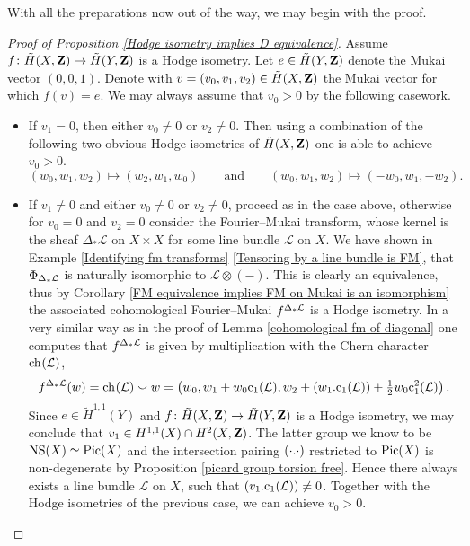 \noindent
With all the preparations now out of the way, we may begin with the proof.
\begin{proof}[Proof of Proposition \ref{Hodge isometry implies D equivalence}]
    Assume $f \colon \,\tilde{\!{H}}(X, \mathbf Z) \to \,\tilde{\!{H}}(Y, \mathbf Z)$ is a Hodge isometry. Let $e \in \,\tilde{\!{H}}(Y, \mathbf Z)$ denote the Mukai vector $(0,0,1)$. Denote with $v =(v_0, v_1, v_2) \in \,\tilde{\!{H}}(X, \mathbf Z)$ the Mukai vector for which $f(v) = e$. We may always assume that $v_0 > 0$ by the following casework.
    \begin{itemize}[label = $\circ$]
        \item If $v_1 = 0$, then either $v_0 \neq 0$ or $v_2 \neq 0$. Then using a combination of the following two obvious Hodge isometries of $\,\tilde{\!{H}}(X, \mathbf Z)$ one is able to achieve $v_0 > 0$. 
        \[
            (w_0, w_1, w_2) \mapsto (w_2, w_1, w_0) \qquad \text{and} \qquad (w_0, w_1, w_2) \mapsto (-w_0, w_1, -w_2).
        \]
        \item If $v_1 \neq 0$ and either $v_0 \neq 0$ or $v_2 \neq 0$, proceed as in the case above, otherwise for $v_0 = 0$ and $v_2 = 0$ consider the Fourier--Mukai transform, whose kernel is the sheaf $\Delta_*\mathcal L$ on $X \times X$ for some line bundle $\mathcal L$ on $X$. We have shown in Example \ref{Identifying fm transforms} \ref{Tensoring by a line bundle is FM}, that $\Phi_{\Delta_*\mathcal L}$ is naturally isomorphic to $\mathcal L \otimes (-)$. This is clearly an equivalence, thus by Corollary \ref{FM equivalence implies FM on Mukai is an isomorphism} the associated cohomological Fourier--Mukai $f^{\Delta_*\mathcal L}$ is a Hodge isometry. In a very similar way as in the proof of Lemma \ref{cohomological fm of diagonal} one computes that $f^{\Delta_*\mathcal L}$ is given by multiplication with the Chern character $\ch[](\mathcal L)$, \ie
        \[
            \fmcoh{\Delta_*\mathcal{L}}(w) = \ch[](\mathcal L) \smallsmile w = \left(w_0, w_1 + w_0 \cclass[1](\mathcal L), w_2 + \intersect{w_1}{\cclass[1](\mathcal L)} + \tfrac{1}{2}w_0\cclass[1]^2(\mathcal L)\right).
        \]
        Since $e \in \widetilde{H}^{1,1}(Y)$ and $f \colon \,\tilde{\!{H}}(X, \mathbf Z) \to \,\tilde{\!{H}}(Y, \mathbf Z)$ is a Hodge isometry, we may conclude that $v_1 \in H^{1,1}(X) \cap H^{2}(X, \mathbf Z)$. The latter group we know to be $\operatorname{NS}(X) \simeq \operatorname{Pic}(X)$ and the intersection pairing $(\cdot.\cdot)$ restricted to $\operatorname{Pic}(X)$ is non-degenerate by Proposition \ref{picard group torsion free}. Hence there always exists a line bundle $\mathcal L$ on $X$, such that $\intersect{v_1}{\cclass[1](\mathcal L)} \neq 0$. Together with the Hodge isometries of the previous case, we can achieve $v_0 > 0$. 

\end{itemize}
\end{proof}
